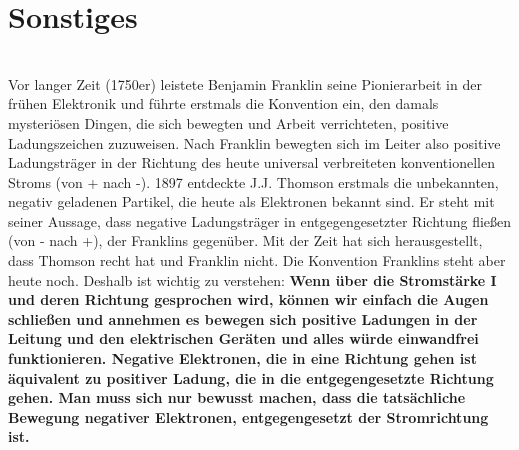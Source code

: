 \documentclass{article}
\begin{document}
\section{Sonstiges}
\vspace{-0.8\baselineskip}
\begin{mdframed}
\centering
\vspace{0.2\baselineskip}
\\
\vspace{0.2\baselineskip}
\justify
Vor langer Zeit (1750er) leistete Benjamin Franklin seine Pionierarbeit in der frühen Elektronik und führte erstmals die Konvention ein, den damals mysteriösen Dingen, die sich bewegten und Arbeit verrichteten, positive Ladungszeichen zuzuweisen. Nach Franklin bewegten sich im Leiter also positive Ladungsträger in der Richtung des heute universal verbreiteten konventionellen Stroms (von + nach -). 1897 entdeckte J.J. Thomson erstmals die unbekannten, negativ geladenen Partikel, die heute als Elektronen bekannt sind. Er steht mit seiner Aussage, dass negative Ladungsträger in entgegengesetzter Richtung fließen (von - nach +), der Franklins gegenüber. Mit der Zeit hat sich herausgestellt, dass Thomson recht hat und Franklin nicht. Die Konvention Franklins steht aber heute noch. Deshalb ist wichtig zu verstehen: \textbf{Wenn über die Stromstärke I und deren Richtung gesprochen wird, können wir einfach die Augen schließen und annehmen es bewegen sich positive Ladungen in der Leitung und den elektrischen Geräten und alles würde einwandfrei funktionieren. Negative Elektronen, die in eine Richtung gehen ist äquivalent zu positiver Ladung, die in die entgegengesetzte Richtung gehen. Man muss sich nur bewusst machen, dass die tatsächliche Bewegung negativer Elektronen, entgegengesetzt der Stromrichtung ist.}
\justify
\centering
\raisebox{-0.5\height}{}
\hspace{2\baselineskip}
\end{mdframed}
\vspace{1.4\baselineskip}
\end{document}
